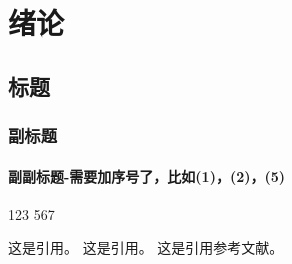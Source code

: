 \chapter{绪\quad 论}

\section{标题}
\subsection{副标题}
\subsubsection{副副标题-需要加序号了，比如(1)，(2)，(5)}



123 567

这是引用\cite{c3}。
这是引用\cite{c2}。
这是引用参考文献\cite{c1}。